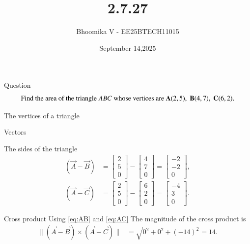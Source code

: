 \documentclass{beamer}
\begin{document}
\title 
{2.7.27}
\date{September 14,2025}


\author 
{Bhoomika V - EE25BTECH11015}




\frame{\titlepage}
\begin{frame}{Question}
\[
\text{Find the area of the triangle } ABC \text{ whose vertices are }\\ \\
\vec{A}(2,5),\; \vec{B}(4,7),\; \vec{C}(6,2).
\]
\end{frame}

\begin{frame}{The vertices of a triangle}
\begin{table}[H]    
  \centering
  
  \caption{Vectors}
  \label{Answers}
\end{table}
\end{frame}

\begin{frame}{The sides of the triangle }
\begin{align}
(\vec{A}-\vec{B})
&= \begin{bmatrix} 2 \\ 5 \\ 0 \end{bmatrix}
  - \begin{bmatrix} 4 \\ 7 \\ 0 \end{bmatrix}
= \begin{bmatrix} -2 \\ -2 \\ 0 \end{bmatrix},
\label{eq:AB} \\[6pt]
(\vec{A}-\vec{C})
&= \begin{bmatrix} 2 \\ 5 \\ 0 \end{bmatrix}
  - \begin{bmatrix} 6 \\ 2 \\ 0 \end{bmatrix}
= \begin{bmatrix} -4 \\ 3 \\ 0 \end{bmatrix}.
\label{eq:AC}
\end{align}
\end{frame}

\begin{frame}{Cross product}
Using \eqref{eq:AB} and \eqref{eq:AC}  The magnitude of the cross product is
\begin{align}
\big\lVert (\vec{A}-\vec{B}) \times (\vec{A}-\vec{C}) \big\rVert
&= \sqrt{0^2 + 0^2 + (-14)^2} = 14.
\label{eq:norm}
\end{align}
\end{frame}
\end{document}
